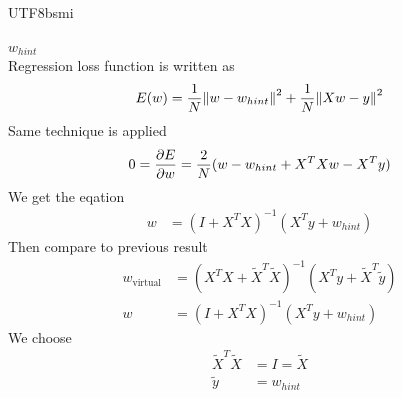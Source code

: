 \documentclass[12pt]{article}
\newenvironment{prob}[2][Prob.]{\begin{trivlist}
\item[\hskip \labelsep {\bfseries #1}\hskip \labelsep {\bfseries #2}]}{\end{trivlist}}
\begin{document}
\begin{CJK}{UTF8}{bsmi}
\begin{prob}{22} $w_{hint}$ \\
Regression loss function is written as 
\[
    E(w) = \frac{1}{N}\norm{w-w_{hint}}^2 + \frac{1}{N}\norm{Xw-y}^2
\]
Same technique is applied
\[
    0 = \pdv{E}{w} = \frac{2}{N} (w - w_{hint}+ X^TXw -X^Ty)
\]
We get the eqation
\begin{align*}
    w &= (I + X^TX)^{-1}(X^Ty + w_{hint})
\end{align*}
Then compare to previous result
\begin{align*}
    w_{\text{virtual}} &= (X^TX + \tilde{X}^T\tilde{X})^{-1}( X^Ty + \tilde{X}^T\tilde{y}) \\
    w &= (I + X^TX)^{-1}(X^Ty + w_{hint})
\end{align*}
We choose 
\begin{align*}
    \tilde{X}^T\tilde{X} &= I = \tilde{X} \\
    \tilde{y}& = w_{hint}
\end{align*}
\end{prob}
\end{CJK} 
\end{document}
